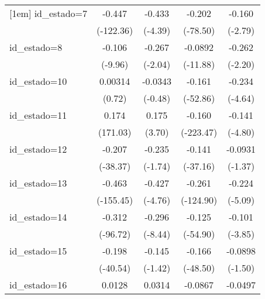 {\begin{tabular}{l*{4}{c}}
[1em]
id\_estado=7         &      -0.447\sym{***}&      -0.433\sym{***}&      -0.202\sym{***}&      -0.160\sym{**} \\
                    &   (-122.36)         &     (-4.39)         &    (-78.50)         &     (-2.79)         \\
[1em]
id\_estado=8         &      -0.106\sym{***}&      -0.267         &     -0.0892\sym{***}&      -0.262\sym{*}  \\
                    &     (-9.96)         &     (-2.04)         &    (-11.88)         &     (-2.20)         \\
[1em]
id\_estado=10        &     0.00314         &     -0.0343         &      -0.161\sym{***}&      -0.234\sym{***}\\
                    &      (0.72)         &     (-0.48)         &    (-52.86)         &     (-4.64)         \\
[1em]
id\_estado=11        &       0.174\sym{***}&       0.175\sym{***}&      -0.160\sym{***}&      -0.141\sym{***}\\
                    &    (171.03)         &      (3.70)         &   (-223.47)         &     (-4.80)         \\
[1em]
id\_estado=12        &      -0.207\sym{***}&      -0.235         &      -0.141\sym{***}&     -0.0931         \\
                    &    (-38.37)         &     (-1.74)         &    (-37.16)         &     (-1.37)         \\
[1em]
id\_estado=13        &      -0.463\sym{***}&      -0.427\sym{***}&      -0.261\sym{***}&      -0.224\sym{***}\\
                    &   (-155.45)         &     (-4.76)         &   (-124.90)         &     (-5.09)         \\
[1em]
id\_estado=14        &      -0.312\sym{***}&      -0.296\sym{***}&      -0.125\sym{***}&      -0.101\sym{***}\\
                    &    (-96.72)         &     (-8.44)         &    (-54.90)         &     (-3.85)         \\
[1em]
id\_estado=15        &      -0.198\sym{***}&      -0.145         &      -0.166\sym{***}&     -0.0898         \\
                    &    (-40.54)         &     (-1.42)         &    (-48.50)         &     (-1.50)         \\
[1em]
id\_estado=16        &      0.0128\sym{*}  &      0.0314         &     -0.0867\sym{***}&     -0.0497         \\

\end{tabular}}
